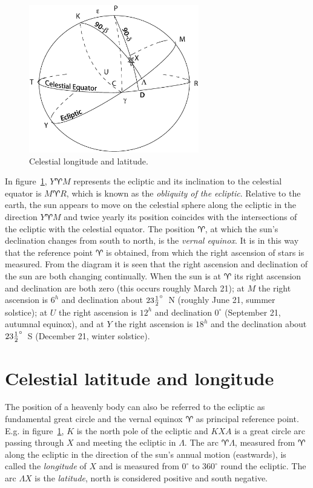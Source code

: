 \begin{figure}[h]
	\centering
	\includegraphics[width=0.66\textwidth]{ecliptic.eps}
	\caption{Celestial longitude and latitude.}
	\label{fig:ecliptic}
\end{figure}

In figure~\ref{fig:ecliptic}, $Y\aries M$ represents the ecliptic and
its inclination to the celestial equator is $M\aries R$, which is
known as the {\it obliquity of the ecliptic}. Relative to the earth,
the sun appears to move on the celestial sphere along the ecliptic in
the direction $Y\aries M$ and twice yearly its position coincides
with the intersections of the ecliptic with the celestial equator. The
position $\aries$, at which the sun's declination changes from south
to north, is the {\it vernal equinox}. It is in this way that the
reference point $\aries$ is obtained, from which the right ascension
of stars is measured. From the diagram it is seen that the right
ascension and declination of the sun are both changing
continually. When the sun is at $\aries$ its right ascension and
declination are both zero (this occurs roughly March 21); at $M$ the
right ascension is $6^h$ and declination about $23 {1\over2}^\circ$~N
(roughly June 21, summer solstice); at $U$ the right ascension is
$12^h$ and declination $0^\circ$ (September 21, autumnal equinox),
and at $Y$ the right ascension is $18^h$ and the declination about $23
{1\over 2}^\circ$~S (December 21, winter solstice).

\section{Celestial latitude and longitude}

The position of a heavenly body can also be referred to the ecliptic
as fundamental great circle and the vernal equinox $\aries$ as principal
reference point. E.g. in figure~\ref{fig:ecliptic}, $K$ is the north pole
of the ecliptic and $KXA$ is a great circle arc passing through $X$
and meeting the ecliptic in $\Lambda$. The arc $\aries\Lambda$,
measured from $\aries$ along the ecliptic in the direction of the
sun's annual motion (eastwards), is called the {\it longitude} of $X$
and is measured from $0^\circ$ to $360^\circ$ round the ecliptic. The
arc $\Lambda X$ is the {\it latitude}, north is considered positive
and south negative. 

